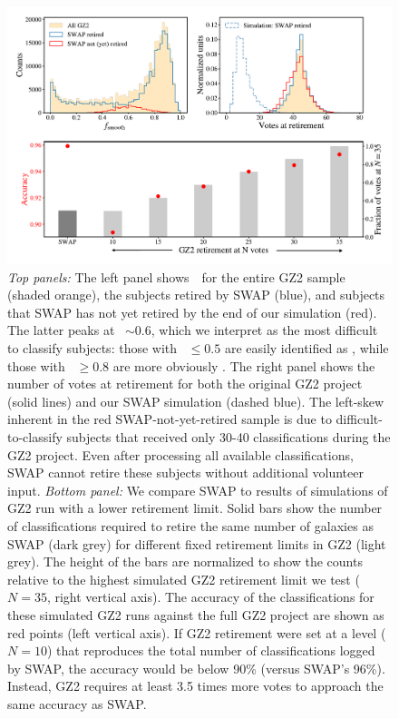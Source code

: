 \begin{figure}
\includegraphics[width=\linewidth]{Figures/human_machine/f6.pdf}
\caption[SWAP's intelligent retirement mechanism requires 3.5 times fewer classifications than GZ2.]{\textit{Top panels:} The left panel shows~\fsmooth~for the entire GZ2 sample (shaded orange), the subjects retired by SWAP (blue), and subjects that SWAP has not yet retired by the end of our simulation (red). The latter peaks at \fsmooth~$\sim 0.6$, which we interpret as the most difficult to classify subjects: those with \fsmooth~$\le 0.5$ are easily identified as \feat, while those with \fsmooth~$\ge 0.8$ are more obviously \notfeat. The right panel shows the number of votes at retirement for both the original GZ2 project (solid lines) and our SWAP simulation (dashed blue). The left-skew inherent in the red SWAP-not-yet-retired sample is due to difficult-to-classify subjects that received only 30-40 classifications during the GZ2 project. Even after processing all available classifications, SWAP cannot retire these subjects without additional volunteer input. 
\textit{Bottom panel:} We compare SWAP to results of simulations of GZ2 run with a lower retirement limit. Solid bars show the number of classifications required to retire the same number of galaxies as SWAP (dark grey) for different fixed retirement limits in GZ2 (light grey). The height of the bars are normalized to show the counts relative to the highest simulated GZ2 retirement limit we test ($N=35$, right vertical axis).  The accuracy of the classifications for these simulated GZ2 runs against the full GZ2 project are shown as red points (left vertical axis). If GZ2 retirement were set at a level ($N=10$) that reproduces the total number of classifications logged by SWAP, the accuracy would be below 90\% (versus SWAP's 96\%).  Instead, GZ2 requires at least 3.5 times more votes to approach the same accuracy as SWAP.}
\label{fig: gz2 min retirement}
\end{figure}

